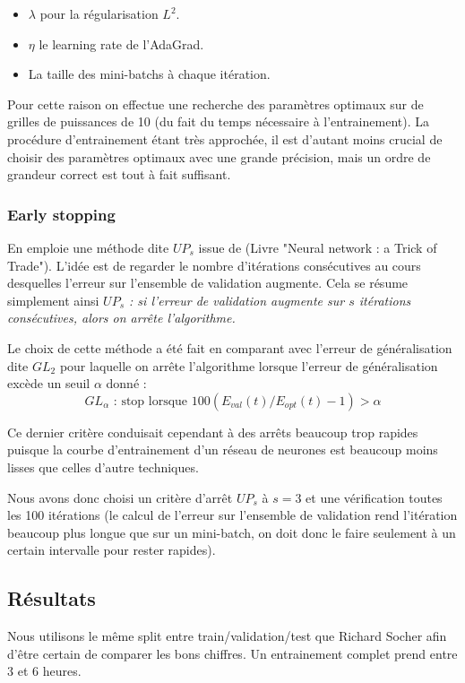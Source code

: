 \documentclass[conference]{IEEEtran}
\begin{document}
\begin{itemize}
\item $\lambda$ pour la régularisation $L^2$.
\item $\eta$ le learning rate de l'AdaGrad.
\item La taille des mini-batchs à chaque itération.
\end{itemize}

Pour cette raison on effectue une recherche des paramètres optimaux sur de grilles de puissances de 10 (du fait du temps nécessaire à l'entrainement). La procédure d'entrainement étant très approchée, il est d'autant moins crucial de choisir des paramètres optimaux avec une grande précision, mais un ordre de grandeur correct est tout à fait suffisant.

\subsubsection{Early stopping}
En emploie une méthode dite $UP_s$ issue de \cite{Prechelt97earlystopping} (Livre "Neural network : a Trick of Trade"). L'idée est de regarder le nombre d'itérations consécutives au cours desquelles l'erreur sur l'ensemble de validation augmente. Cela se résume simplement ainsi \emph{$UP_s$ : si l'erreur de validation augmente sur $s$ itérations consécutives, alors on arrête l'algorithme.}

Le choix de cette méthode a été fait en comparant avec l'erreur de généralisation dite $GL_2$ pour laquelle on arrête l'algorithme lorsque l'erreur de généralisation excède un seuil $\alpha$ donné :
$$GL_\alpha\mbox{ : stop lorsque $100(E_{val}(t)/E_{opt}(t)-1)>\alpha$}$$

Ce dernier critère conduisait cependant à des arrêts beaucoup trop rapides puisque la courbe d'entrainement d'un réseau de neurones est beaucoup moins lisses que celles d'autre techniques.

Nous avons donc choisi un critère d'arrêt $UP_s$ à $s=3$ et une vérification toutes les 100 itérations (le calcul de l'erreur sur l'ensemble de validation rend l'itération beaucoup plus longue que sur un mini-batch, on doit donc le faire seulement à un certain intervalle pour rester rapides).

\subsection{Résultats}
Nous utilisons le même split entre train/validation/test que Richard Socher afin d'être certain de comparer les bons chiffres. Un entrainement complet prend entre 3 et 6 heures.
\end{document}
